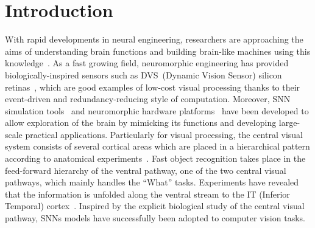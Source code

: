 \section{Introduction}
\label{sec:intro}
With rapid developments in neural engineering, researchers are approaching the aims of understanding brain functions and building brain-like machines using this knowledge~\citep{furber2007neural}.
As a fast growing field, neuromorphic engineering has provided biologically-inspired sensors such as DVS~(Dynamic Vision Sensor) silicon retinas~\citep{serrano-gotarredona_128_2013, lichtsteiner2008128}, which are good examples of low-cost visual processing thanks to their event-driven and redundancy-reducing style of computation.
Moreover, SNN simulation tools~\citep{davison2008pynn, gewaltig2007nest, goodman2008brian} and neuromorphic hardware platforms~\citep{furber2013overview,  schemmel2010wafer, moradi2014event} have been developed to allow exploration of the brain by mimicking its functions and developing large-scale practical applications.
Particularly for visual processing, the central visual system consists of several cortical areas which are placed in a hierarchical pattern according to anatomical experiments~\citep{felleman1991distributed}.
Fast object recognition takes place in  the feed-forward hierarchy of the ventral pathway, one of the two central visual pathways, which mainly handles the ``What'' tasks.
Experiments have revealed that the information is unfolded along the ventral stream to the  IT (Inferior Temporal) cortex~\citep{dicarlo2012does}.
Inspired by the  explicit  biological study of the central visual pathway, SNNs models have successfully been adopted to computer vision tasks. 

